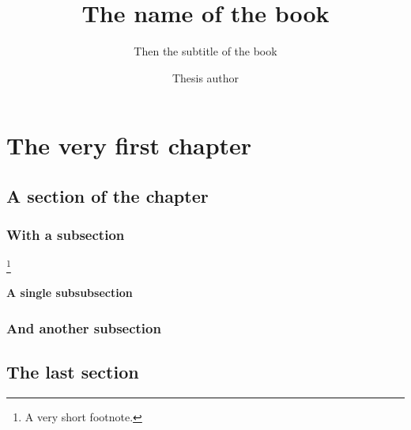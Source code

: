 \documentclass[fontsize=14pt,
               paper=297mm:210mm,
               twoside,
               pagesize=pdftex,
               DIV=calc
]{scrbook}
\title{The name of the book}
\subtitle{Then the subtitle of the book}
\author{Thesis author}
\begin{document}

\frontmatter
\pagestyle{empty}



\setlength{}
\setlength{}
\setlength{} %

\pagestyle{scrheadings}

\mainmatter

\chapter{The very first chapter}
\lipsum[1]

\section{A section of the chapter}
\lipsum[2-3]

\subsection{With a subsection}
\lipsum[4]\footnote{A very short footnote.}

\subsubsection{A single subsubsection}
\lipsum[5]

\subsection{And another subsection}
\lipsum[6]

\section{The last section}
\lipsum[7-8]
\end{document}
